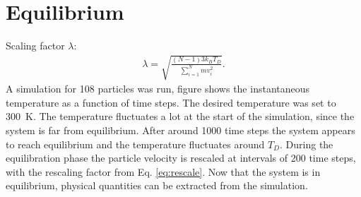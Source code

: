 \section{Equilibrium}
Scaling factor $\lambda$:
\begin{gather}\label{eq:rescale}
    \lambda=\sqrt{\frac{(N-1)3k_BT_D}{\sum_{i=1}^{N} mv_i^{2}}}.
\end{gather}
A simulation for 108 particles was run, figure %
shows the instantaneous temperature as a function of time steps. The desired temperature was set to 300~K. The temperature fluctuates a lot at the start of the simulation, since the system is far from equilibrium. After around 1000 time steps the system appears to reach equilibrium and the temperature fluctuates around $T_D$. During the equilibration phase the particle velocity is rescaled at intervals of 200 time steps, with the rescaling factor from Eq. \ref{eq:rescale}. Now that the system is in equilibrium, physical quantities can be extracted from the simulation.